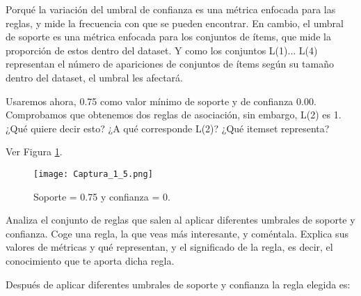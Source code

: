 \documentclass[11pt]{exam}
\begin{document}
\begin{questions}

Porqué la variación del umbral de confianza es una métrica enfocada para las reglas, y mide la frecuencia con que se pueden encontrar. En cambio, el umbral de soporte es una métrica enfocada para los conjuntos de ítems, que mide la proporción de estos dentro del dataset. Y como los  conjuntos L(1)... L(4) representan el número de apariciones de conjuntos de ítems según su tamaño dentro del dataset, el umbral les afectará.

{\question Usaremos ahora, 0.75 como valor mínimo de soporte y de confianza 0.00. Comprobamos que obtenemos dos reglas de asociación, sin embargo, L(2) es 1. ¿Qué quiere decir esto? ¿A qué corresponde L(2)? ¿Qué itemset representa?}

Ver Figura \ref{Captura_1_5}.

\begin{figure}[h]
	\centering
	\texttt{[image: Captura\_1\_5.png]}
	\caption{Soporte = 0.75 y confianza = 0.}
	\label{Captura_1_5}
\end{figure}

{\question Analiza el conjunto de reglas que salen al aplicar diferentes umbrales de soporte y confianza. Coge una regla, la que veas más interesante, y coméntala. Explica sus valores de métricas y qué representan, y el significado de la regla, es decir, el conocimiento que te aporta dicha regla.}

Después de aplicar diferentes umbrales de soporte y confianza la regla elegida es:
\end{questions}
\end{document}
